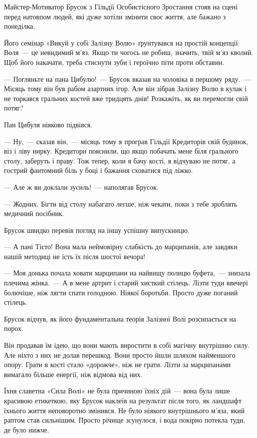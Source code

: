 \documentclass[12pt, a4paper, openany]{book}
\begin{document}
\begin{terrybox}
Майстер-Мотиватор Брусок з Гільдії Особистісного Зростання стояв на сцені перед натовпом людей, які дуже хотіли змінити своє життя, але бажано з понеділка.

Його семінар «Викуй у собі Залізну Волю» ґрунтувався на простій концепції: Воля~--- це невидимий м'яз. Якщо ти чогось не робиш, значить, твій м'яз кволий. Щоб його накачати, треба стиснути зуби і героїчно піти проти обставин.

--- Погляньте на пана Цибулю!~--- Брусок вказав на чоловіка в першому ряду.~--- Місяць тому він був рабом азартних ігор. Але він зібрав Залізну Волю в кулак і не торкався гральних костей вже тридцять днів! Розкажіть, як ви перемогли свій потяг?

Пан Цибуля ніяково підвівся.

--- Ну,~--- сказав він,~--- місяць тому я програв Гільдії Кредиторів свій будинок, віз і ліву нирку. Кредитори пояснили, що якщо побачать мене біля грального столу, заберуть і праву. Тож тепер, коли я бачу кості, я відчуваю не потяг, а гострий фантомний біль у боці і бажання сховатися під ліжко.

--- Але ж ви доклали зусиль!~--- наполягав Брусок.

--- Жодних. Бігти від столу набагато легше, ніж чекати, поки з тебе зроблять медичний посібник.

\medskip
Брусок швидко перевів погляд на іншу успішну випускницю.

--- А пані Тісто! Вона мала неймовірну слабкість до марципанів, але завдяки нашій методиці не їсть їх після шостої вечора!

--- Моя донька почала ховати марципани на найвищу полицю буфета,~--- знизала плечима жінка.~--- А в мене артрит і старий хисткий стілець. Лізти туди ввечері болючіше, ніж лягти спати голодною. Ніякої боротьби. Просто дуже поганий стілець.

\medskip
Брусок відчув, як його фундаментальна теорія Залізної Волі розсипається на порох.

Він продавав їм ідею, що вони мають виростити в собі магічну внутрішню силу. Але ніхто з них не долав перешкод. Вони просто йшли шляхом найменшого опору. Грати в кості стало «дорожче», ніж не грати. Лізти за марципанами вимагало більше енергії, ніж відмова від них.

Їхня славетна «Сила Волі» не була причиною їхніх дій~--- вона була лише красивою етикеткою, яку Брусок наклеїв на результат після того, як ландшафт їхнього життя неповоротно змінився. Не було ніякого внутрішнього м'яза, який раптом став сильнішим. Просто річище зсунулося, і вода покірно потекла туди, де було нижче.


\end{terrybox}
\end{document}
